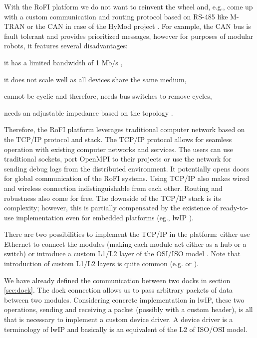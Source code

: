 With the RoFI platform we do not want to reinvent the wheel and, e.g., come up
with a custom communication and routing protocol based on RS-485 like M-TRAN or
the CAN in case of the HyMod project \cite{parrott_hymod:_2016}. For example,
the CAN bus is fault tolerant and provides prioritized messages, however for
purposes of modular robots, it features several disadvantages:
\begin{enumerate*}
    \item it has a limited bandwidth of 1 Mb/s \cite{noauthor_road_2013},
    \item it does not scale well as all devices share the same medium,
    \item cannot be cyclic and therefore, needs bus switches to remove cycles,
    \item needs an adjustable impedance based on the topology
    \cite{parrott_hymod:_2016}.
\end{enumerate*}

Therefore, the RoFI platform leverages traditional computer network based on the
TCP/IP protocol and stack. The TCP/IP protocol allows for seamless operation
with existing computer networks and services. The users can use traditional
sockets, port OpenMPI to their projects or use the network for sending debug
logs from the distributed environment. It potentially opens doors for global
communication of the RoFI systems. Using TCP/IP also makes wired and wireless
connection indistinguishable from each other. Routing and robustness also come
for free. The downside of the TCP/IP stack is its complexity; however, this is
partially compensated by the existence of ready-to-use implementation even for
embedded platforms (eg., lwIP \cite{noauthor_lwip_nodate}).

There are two possibilities to implement the TCP/IP in the platform: either use
Ethernet to connect the modules (making each module act either as a hub or a
switch) or introduce a custom L1/L2 layer of the OSI/ISO model
\cite{braden_requirements_1989}. Note that introduction of custom L1/L2 layers
is quite common (e.g. \cite{lindgren_ip_2008} or \cite{waitzman_ip_1999}).

We have already defined the communication between two docks in section
\ref{sec:dock}. The dock connection allows us to pass arbitrary packets of data
between two modules. Considering concrete implementation in lwIP, these two
operations, sending and receiving a packet (possibly with a custom header), is
all that is necessary to implement a custom device driver. A device driver is a
terminology of lwIP and basically is an equivalent of the L2 of ISO/OSI model.

